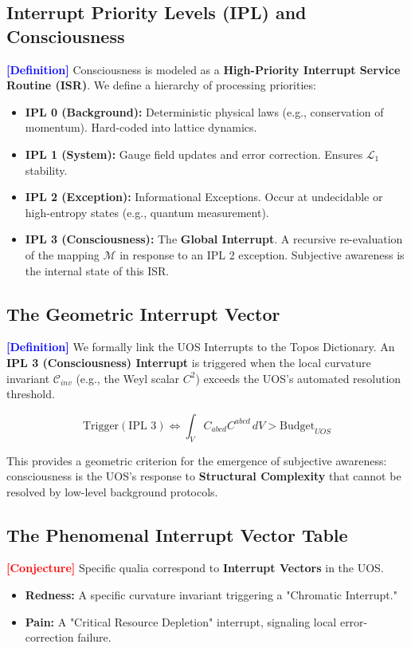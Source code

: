 \documentclass[11pt,titlepage]{article}
\newcommand{\protocol}{\mathcal{L}_1}
\newcommand{\curvature}{\mathcal{C}}
\newcommand{\tagdef}{\textcolor{blue}{\textbf{[Definition]}} }
\newcommand{\tagconj}{\textcolor{red}{\textbf{[Conjecture]}} }
\begin{document}
\subsection{Interrupt Priority Levels (IPL) and Consciousness}
\tagdef Consciousness is modeled as a \textbf{High-Priority Interrupt Service Routine (ISR)}. We define a hierarchy of processing priorities:
\begin{itemize}
    
\item \textbf{IPL 0 (Background):} Deterministic physical laws (e.g., conservation of momentum). Hard-coded into lattice dynamics.
    
\item \textbf{IPL 1 (System):} Gauge field updates and error correction. Ensures $\protocol$ stability.
    
\item \textbf{IPL 2 (Exception):} Informational Exceptions. Occur at undecidable or high-entropy states (e.g., quantum measurement).
    
\item \textbf{IPL 3 (Consciousness):} The \textbf{Global Interrupt}. A recursive re-evaluation of the mapping $\mathcal{M}$ in response to an IPL 2 exception. Subjective awareness is the internal state of this ISR.
\end{itemize}


\subsection{The Geometric Interrupt Vector}
\tagdef We formally link the UOS Interrupts to the Topos Dictionary. An \textbf{IPL 3 (Consciousness) Interrupt} is triggered when the local curvature invariant $\curvature_{inv}$ (e.g., the Weyl scalar $C^2$) exceeds the UOS's automated resolution threshold.

\begin{equation}
\text{Trigger}(\text{IPL 3}) \iff \int_{V} C_{abcd}C^{abcd} \, dV > \text{Budget}_{UOS}
\end{equation}

This provides a geometric criterion for the emergence of subjective awareness: consciousness is the UOS's response to \textbf{Structural Complexity} that cannot be resolved by low-level background protocols.

\subsection{The Phenomenal Interrupt Vector Table}
\tagconj Specific qualia correspond to \textbf{Interrupt Vectors} in the UOS.
\begin{itemize}
    
\item \textbf{Redness:} A specific curvature invariant triggering a "Chromatic Interrupt."
    
\item \textbf{Pain:} A "Critical Resource Depletion" interrupt, signaling local error-correction failure.
\end{itemize}
\end{document}
